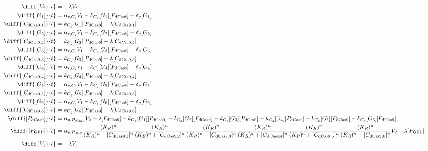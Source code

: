\begin{align}
\diff{\constructGen{2}}{t} & = - \dilutionRate{}\constructGen{2}\\
\diff{\conc{\gRna{1}}}{t} & =  \txRate{\gRna{1}}\constructGen{1} - \gRnaBind{}\conc{\gRna{1}}\conc{\proSp{\cas{}}} - \rnaDegradeRate{}\conc{\gRna{1}}\\
\diff{\conc{\cplx{\cas}{1}}}{t} & =  \gRnaBind{}\conc{\gRna{1}}\conc{\proSp{\cas{}}} - \dilutionRate{}\conc{\cplx{\cas}{1}}\\
\diff{\conc{\gRna{2}}}{t} & =  \txRate{\gRna{2}}\constructGen{1} - \gRnaBind{}\conc{\gRna{2}}\conc{\proSp{\cas{}}} - \rnaDegradeRate{}\conc{\gRna{2}}\\
\diff{\conc{\cplx{\cas}{2}}}{t} & =  \gRnaBind{}\conc{\gRna{2}}\conc{\proSp{\cas{}}} - \dilutionRate{}\conc{\cplx{\cas}{2}}\\
\diff{\conc{\gRna{3}}}{t} & =  \txRate{\gRna{3}}\constructGen{1} - \gRnaBind{}\conc{\gRna{3}}\conc{\proSp{\cas{}}} - \rnaDegradeRate{}\conc{\gRna{3}}\\
\diff{\conc{\cplx{\cas}{3}}}{t} & =  \gRnaBind{}\conc{\gRna{3}}\conc{\proSp{\cas{}}} - \dilutionRate{}\conc{\cplx{\cas}{3}}\\
\diff{\conc{\gRna{4}}}{t} & =  \txRate{\gRna{4}}\constructGen{1} - \gRnaBind{}\conc{\gRna{4}}\conc{\proSp{\cas{}}} - \rnaDegradeRate{}\conc{\gRna{4}}\\
\diff{\conc{\cplx{\cas}{4}}}{t} & =  \gRnaBind{}\conc{\gRna{4}}\conc{\proSp{\cas{}}} - \dilutionRate{}\conc{\cplx{\cas}{4}}\\
\diff{\conc{\gRna{5}}}{t} & =  \txRate{\gRna{5}}\constructGen{1} - \gRnaBind{}\conc{\gRna{5}}\conc{\proSp{\cas{}}} - \rnaDegradeRate{}\conc{\gRna{5}}\\
\diff{\conc{\cplx{\cas}{5}}}{t} & =  \gRnaBind{}\conc{\gRna{5}}\conc{\proSp{\cas{}}} - \dilutionRate{}\conc{\cplx{\cas}{5}}\\
\diff{\conc{\gRna{6}}}{t} & =  \txRate{\gRna{6}}\constructGen{1} - \gRnaBind{}\conc{\gRna{6}}\conc{\proSp{\cas{}}} - \rnaDegradeRate{}\conc{\gRna{6}}\\
\diff{\conc{\cplx{\cas}{6}}}{t} & =  \gRnaBind{}\conc{\gRna{6}}\conc{\proSp{\cas{}}} - \dilutionRate{}\conc{\cplx{\cas}{6}}\\
\diff{\conc{\proSp{\cas{}}}}{t} & =  \txtlRate{\proSp{\cas{}}}\constructGen{2} - \dilutionRate{}\conc{\proSp{\cas{}}} - \gRnaBind{}\conc{\gRna{1}}\conc{\proSp{\cas{}}} - \gRnaBind{}\conc{\gRna{2}}\conc{\proSp{\cas{}}} - \gRnaBind{}\conc{\gRna{3}}\conc{\proSp{\cas{}}} - \gRnaBind{}\conc{\gRna{4}}\conc{\proSp{\cas{}}} - \gRnaBind{}\conc{\gRna{5}}\conc{\proSp{\cas{}}} - \gRnaBind{}\conc{\gRna{6}}\conc{\proSp{\cas{}}}\\
\diff{\conc{\proSp{\gfp}}}{t} & =  \txtlRate{\proSp{\gfp}}\frac{(K_R)^n}{(K_R)^n + \conc{\cplx{\cas}{1}}^n}\frac{(K_R)^n}{(K_R)^n + \conc{\cplx{\cas}{2}}^n}\frac{(K_R)^n}{(K_R)^n + \conc{\cplx{\cas}{3}}^n}\frac{(K_R)^n}{(K_R)^n + \conc{\cplx{\cas}{4}}^n}\frac{(K_R)^n}{(K_R)^n + \conc{\cplx{\cas}{5}}^n}\frac{(K_R)^n}{(K_R)^n + \conc{\cplx{\cas}{6}}^n}\constructGen{2} - \dilutionRate{}\conc{\proSp{\gfp}}\\
\diff{\constructGen{1}}{t} & = - \dilutionRate{}\constructGen{1}
\end{align}

